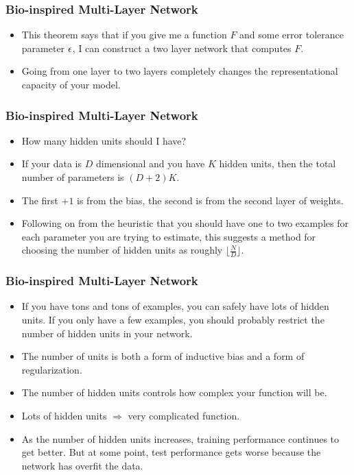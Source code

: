 \documentclass[trans]{beamer}
\begin{document}
\begin{frame}
  \frametitle{Bio-inspired Multi-Layer Network}
\begin{itemize}
\item
This theorem  says that if you give
me a function $F$ and some error tolerance parameter $\epsilon$, I can
construct a two layer network that computes $F$. 
\item Going from one layer to two layers completely changes the
representational capacity of your model.
\end{itemize}
\end{frame}

\begin{frame}
  \frametitle{Bio-inspired Multi-Layer Network}
\begin{itemize}
\item
How many
hidden units should I have?  
\item If your data is $D$ dimensional and you
have $K$ hidden units, then the total number of parameters is
$(D+2)K$.
\item   The first $+1$ is from the bias, the second is from the
second layer of weights.
\item   Following on from the heuristic that you
should have one to two examples for each parameter you are trying to
estimate, this suggests a method for choosing the number of hidden
units as roughly $\lfloor \frac N D \rfloor$.  
\end{itemize}
\end{frame}

\begin{frame}
  \frametitle{Bio-inspired Multi-Layer Network}
\begin{itemize}
\item
If you
have tons and tons of examples, you can safely have lots of hidden
units.  If you only have a few examples, you should probably restrict
the number of hidden units in your network.
\item 
The number of units is both a form of inductive bias and a form of
regularization. 
\item The number of hidden units controls how
complex your function will be.
\item  Lots of hidden units $\Rightarrow$
very complicated function. 
\item  As the number of hidden units increases, training performance continues
to get better.  But at some point, test performance gets worse because
the network has overfit the data.
\end{itemize}
\end{frame}
\end{document}
